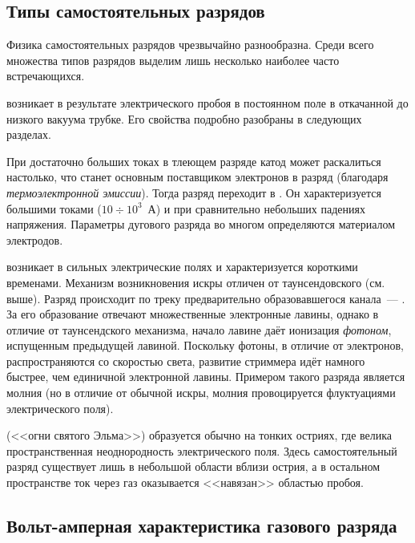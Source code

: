 

\subsection*{Типы самостоятельных разрядов}

Физика самостоятельных разрядов чрезвычайно разнообразна. Среди всего
множества типов разрядов выделим лишь несколько наиболее часто встречающихся.

 возникает в результате электрического пробоя в
постоянном поле в откачанной до низкого вакуума трубке. Его свойства
подробно разобраны в следующих разделах.

При достаточно больших токах в тлеющем разряде катод может раскалиться
настолько, что станет основным поставщиком электронов в разряд
(благодаря \emph{термоэлектронной эмиссии}). Тогда разряд
переходит в . Он характеризуется большими
токами ($10\div 10^3$~А) и при сравнительно небольших падениях
напряжения. Параметры дугового разряда во многом определяются материалом
электродов.


 возникает в сильных электрические полях
и характеризуется короткими временами. 
Механизм возникновения искры отличен от таунсендовского (см. выше).
Разряд происходит по треку предварительно образовавшегося канала~--- 
. За его образование отвечают множественные электронные лавины,
однако в отличие от таунсендского механизма, начало лавине даёт ионизация
\emph{фотоном}, испущенным предыдущей лавиной. Поскольку фотоны, в отличие
от электронов, распространяются со скоростью света, развитие стриммера идёт
намного быстрее, чем единичной электронной лавины. 
Примером такого разряда является молния (но в отличие от обычной
искры, молния провоцируется флуктуациями электрического поля).



 (<<огни святого Эльма>>)
образуется обычно на тонких остриях, где велика пространственная
неоднородность электрического поля. Здесь самостоятельный разряд
существует лишь в небольшой области вблизи острия, а в остальном
пространстве ток через газ оказывается <<навязан>> областью пробоя.



\subsection*{Вольт-амперная характеристика газового разряда}

